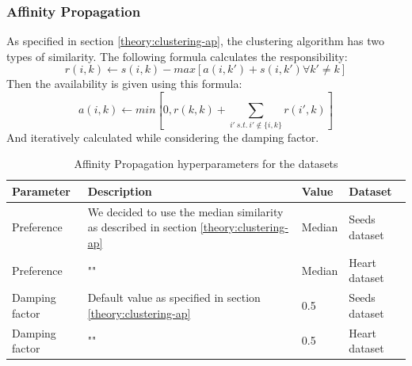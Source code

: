 \subsubsection{Affinity Propagation}
As specified in section \ref{theory:clustering-ap}, the clustering algorithm has two types of similarity.
The following formula calculates the responsibility:
\begin{equation}
  r(i, k) \leftarrow s(i, k) - max [ a(i, k') + s(i, k') \forall k' \neq k ]
\end{equation}
Then the availability is given using this formula:
\begin{equation}
  a(i, k) \leftarrow min [0, r(k, k) + \sum_{i'~s.t.~i' \notin \{i, k\}}{r(i', k)}]
\end{equation}
And iteratively calculated while considering the damping factor.
\begin{table}[h]
  \begin{tabular}{|l|p{6cm}|l|l|}
    \hline
    Parameter      & Description                                                                                & Value  & Dataset       \\
    \hline
    Preference     & We decided to use the median similarity as described in section \ref{theory:clustering-ap} & Median & Seeds dataset \\
    \hline
    Preference     & ""                                                                                         & Median & Heart dataset \\
    \hline

    Damping factor & Default value as specified in section \ref{theory:clustering-ap}                           & 0.5    & Seeds dataset \\
    \hline
    Damping factor & ""                                                                                         & 0.5    & Heart dataset \\
    \hline
  \end{tabular}
  \caption{Affinity Propagation hyperparameters for the datasets}
  \label{tab:ap-formula-sklearn}
\end{table}
